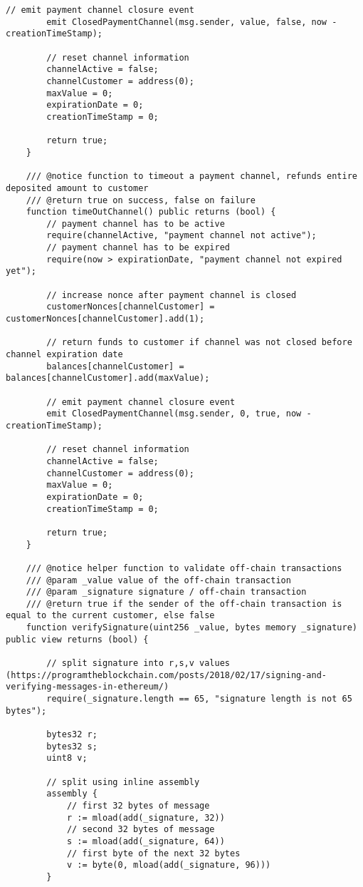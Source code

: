 \begin{lstlisting}[language=Solidity, caption={Payment Channel Smart Contract}, label={lis:pc_sc}]
        // emit payment channel closure event
        emit ClosedPaymentChannel(msg.sender, value, false, now - creationTimeStamp);

        // reset channel information
        channelActive = false;
        channelCustomer = address(0);
        maxValue = 0;
        expirationDate = 0;
        creationTimeStamp = 0;

        return true;
    }

    /// @notice function to timeout a payment channel, refunds entire deposited amount to customer
    /// @return true on success, false on failure
    function timeOutChannel() public returns (bool) {
        // payment channel has to be active
        require(channelActive, "payment channel not active");
        // payment channel has to be expired
        require(now > expirationDate, "payment channel not expired yet");

        // increase nonce after payment channel is closed
        customerNonces[channelCustomer] = customerNonces[channelCustomer].add(1);

        // return funds to customer if channel was not closed before channel expiration date
        balances[channelCustomer] = balances[channelCustomer].add(maxValue);

        // emit payment channel closure event
        emit ClosedPaymentChannel(msg.sender, 0, true, now - creationTimeStamp);

        // reset channel information
        channelActive = false;
        channelCustomer = address(0);
        maxValue = 0;
        expirationDate = 0;
        creationTimeStamp = 0;

        return true;
    }

    /// @notice helper function to validate off-chain transactions
    /// @param _value value of the off-chain transaction
    /// @param _signature signature / off-chain transaction
    /// @return true if the sender of the off-chain transaction is equal to the current customer, else false
    function verifySignature(uint256 _value, bytes memory _signature) public view returns (bool) {

        // split signature into r,s,v values (https://programtheblockchain.com/posts/2018/02/17/signing-and-verifying-messages-in-ethereum/)
        require(_signature.length == 65, "signature length is not 65 bytes");

        bytes32 r;
        bytes32 s;
        uint8 v;

        // split using inline assembly
        assembly {
            // first 32 bytes of message
            r := mload(add(_signature, 32))
            // second 32 bytes of message
            s := mload(add(_signature, 64))
            // first byte of the next 32 bytes
            v := byte(0, mload(add(_signature, 96)))
        }


\end{lstlisting}
